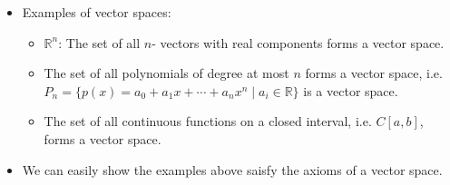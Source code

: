 \begin{frame}
    \begin{itemize}
         \item Examples of vector spaces:
            \begin{itemize}
                \item $\mathbb{R}^n$: The set of all $n$- vectors with real components forms a vector space.
                \item The set of all polynomials of degree at most $n$ forms a vector space, i.e. $P_n = \{ p(x) = a_0 + a_1 x + \cdots + a_n x^n \mid a_i \in \mathbb{R} \}$ is a vector space.
                \item The set of all continuous functions on a closed interval, i.e. $C[a, b]$, forms a vector space.
            \end{itemize}
    \item We can easily show the examples above saisfy the axioms of a vector space.
    \end{itemize}
\end{frame}

